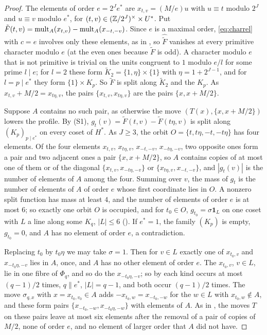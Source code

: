 \begin{proof}
The elements of order $e=2^{J}e^{*}$ are
$x_{t,v}=(M/e)u$ with $u\equiv t$ modulo $2^{J}$ and $u\equiv v$ modulo
$e^{*}$, for $(t,v)\in(\mathbb{Z}/2^{J})^{\times}\times U^{*}$. Put
$\tilde F(t,v)=\operatorname{mult}_{A}(x_{t,v})-\operatorname{mult}_{A}(x_{-t,-v})$. Since $e$ is a
maximal order, \eqref{eq:charrel} with $c=e$ involves only these elements, as
in , so $\hat{\tilde F}$ vanishes at every primitive character
modulo $e$ (at the even ones because $\tilde F$ is odd). A character modulo
$e$ that is not primitive is trivial on the units congruent to $1$ modulo
$e/l$ for some prime $l\mid e$; for $l=2$ these form $\tilde K_{2}=\{1,\eta\}
\times\{1\}$ with $\eta=1+2^{J-1}$, and for $l=p\mid e^{*}$ they form
$\{1\}\times K_{p}$. So $\tilde F$ is split along $\tilde K_{2}$ and the
$K_{p}$. As $x_{t,v}+M/2=x_{t\eta,v}$, the pairs $\{x_{t,v},x_{t\eta,v}\}$ are
the pairs $\{x,x+M/2\}$.

Suppose $A$ contains no such pair, as otherwise the move $(T(x),\{x,x+M/2\})$
lowers the profile. By (S1), $g_{t}(v)=\tilde F(t,v)-\tilde F(t\eta,v)$ is
split along $(K_{p})_{p\mid e^{*}}$ on every coset of $H^{*}$. As $J\ge3$, the
orbit $O=\{t,t\eta,-t,-t\eta\}$ has four elements. Of the four elements
$x_{t,v}$, $x_{t\eta,v}$, $x_{-t,-v}$, $x_{-t\eta,-v}$, two opposite ones
form a pair and two adjacent ones a pair $\{x,x+M/2\}$, so $A$ contains copies
of at most one of them or of the diagonal $\{x_{t,v},x_{-t\eta,-v}\}$ or
$\{x_{t\eta,v},x_{-t,-v}\}$, and $|g_{t}(v)|$ is the number of elements of
$A$ among the four. Summing over $v$, the mass of $g_{t}$ is the number of
elements of $A$ of order $e$ whose first coordinate lies in $O$. A nonzero
split function has mass at least $4$, and the number of elements of order $e$
is at most $6$; so exactly one orbit $O$ is occupied, and for $t_{0}\in O$,
$g_{t_{0}}=\sigma\mathbf 1_{L}$ on one coset with $L$ a line along some
$K_{q}$, $|L|\le6$ (). If $e^{*}=1$, the family $(K_{p})$ is
empty, $g_{t_{0}}=0$, and $A$ has no element of order $e$, a contradiction.

Replacing $t_{0}$ by $t_{0}\eta$ we may take $\sigma=1$. Then for $v\in L$
exactly one of $x_{t_{0},v}$ and $x_{-t_{0}\eta,-v}$ lies in $A$, once, and
$A$ has no other element of order $e$. The $x_{t_{0},v}$, $v\in L$, lie in one
fibre of $\Phi_{q}$, and so do the $x_{-t_{0}\eta,-v}$; so by
 each kind occurs at most $(q-1)/2$ times, $q\parallel
e^{*}$, $|L|=q-1$, and both occur $(q-1)/2$ times. The move $\sigma_{q,x}$ with
$x=x_{t_{0},v_{0}}\in A$ adds $-x_{t_{0},w}=x_{-t_{0},-w}$ for the $w\in L$
with $x_{t_{0},w}\notin A$, and these form pairs
$\{x_{-t_{0},-w},x_{-t_{0}\eta,-w}\}$ with elements of $A$. As in
, the moves $T$ on these pairs leave at most six elements
after the removal of a pair of copies of $M/2$, none of order $e$, and no
element of larger order that $A$ did not have.
\end{proof}

